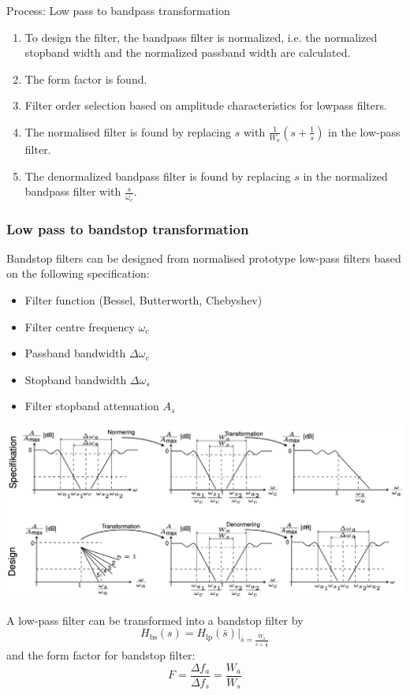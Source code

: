 Process: Low pass to bandpass transformation
\begin{enumerate}
  \item To design the filter, the bandpass filter is normalized, i.e. the normalized stopband width and the normalized passband width are calculated.
  \item The form factor is found.
  \item Filter order selection based on amplitude characteristics for lowpass filters.
  \item The normalised filter is found by replacing $s$ with $\frac{1}{W_{a}} \left( s + \frac{1}{s} \right)$ in the low-pass filter.
  \item The denormalized bandpass filter is found by replacing $s$ in the normalized bandpass filter with $\frac{s}{\omega_{c}}$.
\end{enumerate}

\subsubsection{Low pass to bandstop transformation}
Bandstop filters can be designed from normalised prototype low-pass filters based on the following specification:
\begin{itemize}
  \item Filter function (Bessel, Butterworth, Chebyshev) 
  \item Filter centre frequency $\omega_{c}$ 
  \item Passband bandwidth $\Delta\omega_{c}$ 
  \item Stopband bandwidth $\Delta\omega_{s}$ 
  \item Filter stopband attenuation $A_{s}$
\end{itemize}

\begin{center}
  \includegraphics[width=\textwidth]{Images/LP-to-BS.png} 
\end{center}
A low-pass filter can be transformed into a bandstop filter by
$$H_{\text{bs}}(s)=H_{\text{lp}}(\bar{s})|_{\bar{s}=\frac{W_{a}}{s+\frac{1}{s}}}$$
and the form factor for bandstop filter:
$$F=\frac{\Delta f_{a}}{\Delta f_{s}}=\frac{W_{a}}{W_{s}}$$

